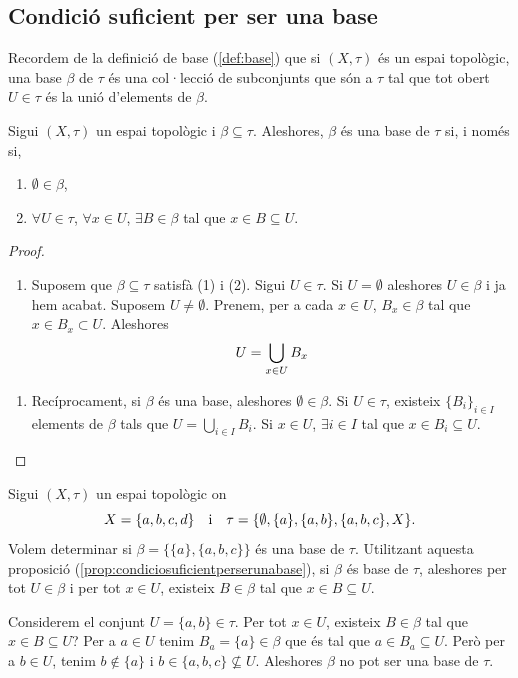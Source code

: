 \documentclass[../main.tex]{subfiles}
\begin{document}
\subsection{Condició suficient per ser una base}
Recordem de la definició de base (\ref{def:base}) que si $(X,\tau)$ és un espai topològic, una base $\beta$ de $\tau$ és una col·lecció de subconjunts que són a $\tau$ tal que tot obert $U\in\tau$ és la unió d'elements de $\beta$.



\begin{prop}
\label{prop:condiciosuficientperserunabase} Sigui $(X,\tau)$ un espai topològic i $\beta\subseteq\tau$. Aleshores, $\beta$ és una base de $\tau$ si, i només si,
\begin{enumerate}[(1)]
    \item $\emptyset\in\beta$,
    \item $\forall U\in \tau$, $\forall x\in U$, $\exists B\in\beta$ tal que $x\in B\subseteq U$.
\end{enumerate}
\end{prop}
\begin{proof}
\begin{enumerate}[($\Leftarrow$)]
    \item Suposem que $\beta\subseteq \tau$ satisfà (1) i (2). Sigui $U\in\tau$. Si $U = \emptyset$ aleshores $U\in\beta$ i ja hem acabat. Suposem $U\not=\emptyset$. Prenem, per a cada $x\in U$, $B_x\in\beta$ tal que $x\in B_x\subset U$. Aleshores
    \begin{equation}
        \notag
        U = \bigcup_{x\in U}B_x
    \end{equation}
\end{enumerate}
\begin{enumerate}[($\Rightarrow$)]
    \item Recíprocament, si $\beta$ és una base, aleshores $\emptyset\in \beta$. Si $U\in\tau$, existeix $\{B_i\}_{i\in I}$ elements de $\beta$ tals que $U = \bigcup_{i\in I} B_i$. Si $x\in U$, $\exists i\in I$ tal que $x\in B_i\subseteq U$.
\end{enumerate}
\end{proof}

\begin{ej}
\label{ej:condiciosuficientperserunabase} Sigui $(X,\tau)$ un espai topològic on
\begin{equation}
    \notag
    X = \{a,b,c,d\}\quad\text{i}\quad\tau = \{\emptyset,\{a\},\{a,b\},\{a,b,c\},X\} .
\end{equation}
Volem determinar si $\beta = \{\{a\},\{a,b,c\}\}$ és una base de $\tau$. Utilitzant aquesta proposició (\ref{prop:condiciosuficientperserunabase}), si $\beta$ és base de $\tau$, aleshores per tot $U\in\beta$ i per tot $x\in U$, existeix $B\in\beta$ tal que $x\in B\subseteq U$.

Considerem el conjunt $U = \{a,b\}\in\tau$. Per tot $x\in U$, existeix $B\in\beta$ tal que $x\in B\subseteq U$? Per a $a\in U$ tenim $B_a = \{a\}\in\beta$ que és tal que $a\in B_a\subseteq U$. Però per a $b\in U$, tenim $b\not\in\{a\}$ i $b\in\{a,b,c\}\not\subseteq U$. Aleshores $\beta$ no pot ser una base de $\tau$.
\end{ej}
\end{document}
